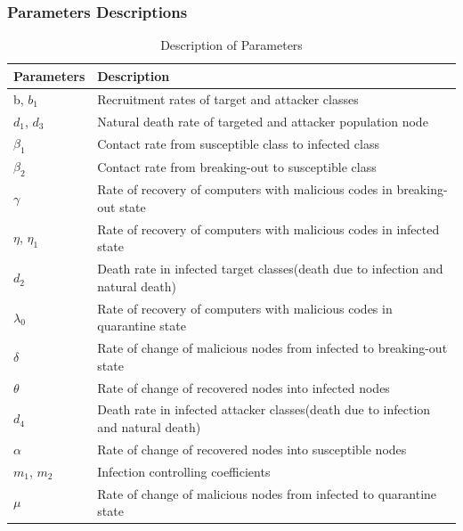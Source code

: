\documentclass{beamer}
\begin{document}
\begin{frame}\frametitle{{Parameters Descriptions}}
\tiny \begin{table}
\begin{tabular}{|p{2 cm}|p{7 cm}|}
\hline
\bf Parameters & \bf Description \\
\hline
b, $b_1$ & Recruitment rates of target and attacker classes\\
\hline
$d_1$, $d_3$ & Natural death rate of targeted and attacker population node\\
\hline
$\beta_1$ & Contact rate from susceptible class to infected class\\
\hline
$\beta_2$ & Contact rate from breaking-out to susceptible class\\
\hline
$\gamma$ &Rate of recovery of computers with malicious codes in breaking-out state\\
\hline
$\eta$, $\eta_1$ &Rate of recovery of computers with malicious codes in infected state\\
\hline
$d_2$ &Death rate in infected target classes(death due to infection and natural death)\\
\hline
$\lambda_0$ &Rate of recovery of computers with malicious codes in quarantine state\\
\hline
$\delta$ &Rate of change of malicious nodes from infected to breaking-out state\\
\hline
$\theta$ &Rate of change of recovered nodes into infected nodes\\
\hline
$d_4$ &Death rate in infected attacker classes(death due to infection and natural death)\\
\hline
$\alpha$ &Rate of change of recovered nodes into susceptible nodes\\
\hline
$m_1$, $m_2$ &Infection controlling coefficients\\
\hline
$\mu$ &Rate of change of malicious nodes from infected to quarantine state\\
\hline
\end{tabular}
\caption {Description of Parameters}
\label{table:param1a}
\end{table}
\end{frame}
\end{document}
